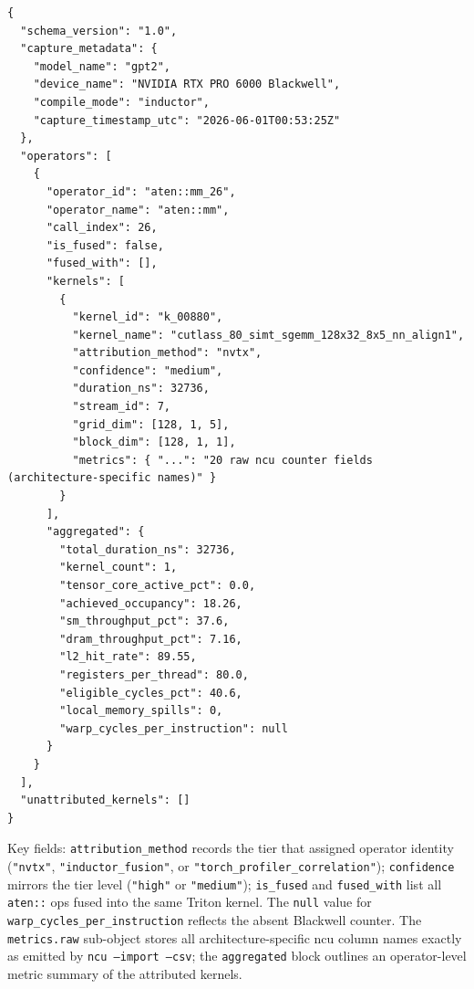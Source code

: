 \begin{lstlisting}[basicstyle=\scriptsize\ttfamily, breaklines=true, frame=single,
                   xleftmargin=2pt, xrightmargin=2pt]
{
  "schema_version": "1.0",
  "capture_metadata": {
    "model_name": "gpt2",
    "device_name": "NVIDIA RTX PRO 6000 Blackwell",
    "compile_mode": "inductor",
    "capture_timestamp_utc": "2026-06-01T00:53:25Z"
  },
  "operators": [
    {
      "operator_id": "aten::mm_26",
      "operator_name": "aten::mm",
      "call_index": 26,
      "is_fused": false,
      "fused_with": [],
      "kernels": [
        {
          "kernel_id": "k_00880",
          "kernel_name": "cutlass_80_simt_sgemm_128x32_8x5_nn_align1",
          "attribution_method": "nvtx",
          "confidence": "medium",
          "duration_ns": 32736,
          "stream_id": 7,
          "grid_dim": [128, 1, 5],
          "block_dim": [128, 1, 1],
          "metrics": { "...": "20 raw ncu counter fields (architecture-specific names)" }
        }
      ],
      "aggregated": {
        "total_duration_ns": 32736,
        "kernel_count": 1,
        "tensor_core_active_pct": 0.0,
        "achieved_occupancy": 18.26,
        "sm_throughput_pct": 37.6,
        "dram_throughput_pct": 7.16,
        "l2_hit_rate": 89.55,
        "registers_per_thread": 80.0,
        "eligible_cycles_pct": 40.6,
        "local_memory_spills": 0,
        "warp_cycles_per_instruction": null
      }
    }
  ],
  "unattributed_kernels": []
}
\end{lstlisting}

Key fields: \texttt{attribution\_method} records the tier that assigned operator identity
(\texttt{"nvtx"}, \texttt{"inductor\_fusion"}, or \texttt{"torch\_profiler\_correlation"});
\texttt{confidence} mirrors the tier level (\texttt{"high"} or \texttt{"medium"});
\texttt{is\_fused} and \texttt{fused\_with} list all \texttt{aten::} ops fused into the
same Triton kernel.  The \texttt{null} value for \texttt{warp\_cycles\_per\_instruction}
reflects the absent Blackwell counter.
The \texttt{metrics.raw} sub-object stores all architecture-specific ncu column names
exactly as emitted by \texttt{ncu --import --csv}; the \texttt{aggregated} block outlines an operator-level metric summary of the attributed kernels.

